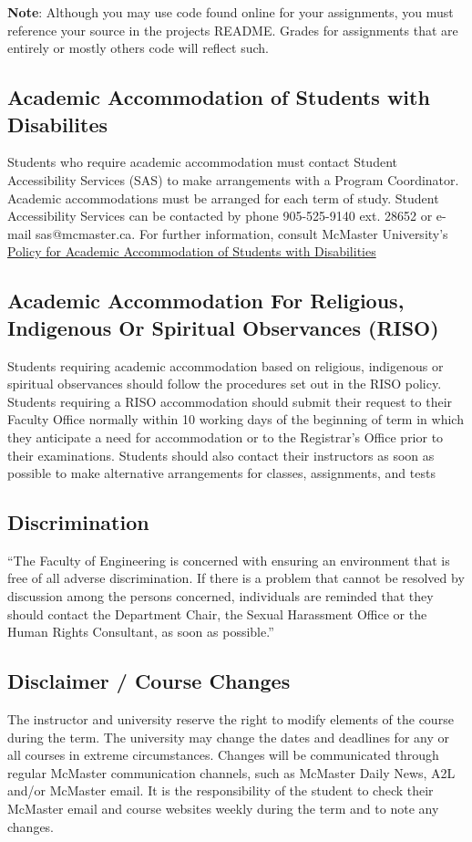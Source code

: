 \documentclass{article}
\begin{document}
\textbf{Note}: Although you may use code found online for your assignments, you must reference your source in the projects README. Grades for assignments that are entirely or mostly others code will reflect such.

\subsection{Academic Accommodation of Students with Disabilites}
\label{sec:org539603e}
Students who require academic accommodation must contact Student Accessibility Services (SAS) to make arrangements with a Program Coordinator. 
Academic accommodations must be arranged for each term of study. Student Accessibility Services can be contacted by phone 905-525-9140 ext. 
28652 or e-mail sas@mcmaster.ca. For further information, consult McMaster University’s \href{http://www.mcmaster.ca/policy/Students-AcademicStudies/AcademicAccommodation-StudentsWithDisabilities.pdf}{Policy for Academic Accommodation of Students with Disabilities}

\subsection{Academic Accommodation For Religious, Indigenous Or Spiritual Observances (RISO)}
\label{sec:org60b11eb}
Students requiring academic accommodation based on religious, indigenous or
spiritual observances should follow the procedures set out in the RISO policy.
Students requiring a RISO accommodation should submit their request to their
Faculty Office normally within 10 working days of the beginning of term in which
they anticipate a need for accommodation or to the Registrar's Office prior to
their examinations. Students should also contact their instructors as soon as
possible to make alternative arrangements for classes, assignments, and tests

\subsection{Discrimination}
\label{sec:org3b491a9}
“The Faculty of Engineering is concerned with ensuring an environment that is free of all adverse discrimination. If there is a problem that cannot be resolved by discussion among the persons concerned, individuals are reminded that they should contact the Department Chair, the Sexual Harassment Office or the Human Rights Consultant, as soon as possible.”

\subsection{Disclaimer / Course Changes}
\label{sec:org53b5252}
The instructor and university reserve the right to modify elements of the
course during the term. The university may change the dates and deadlines for
any or all courses in extreme circumstances. Changes will be communicated
through regular McMaster communication channels, such as McMaster Daily News,
A2L and/or McMaster email. It is the responsibility of the student to check
their McMaster email and course websites weekly during the term and to note
any changes.
\end{document}
